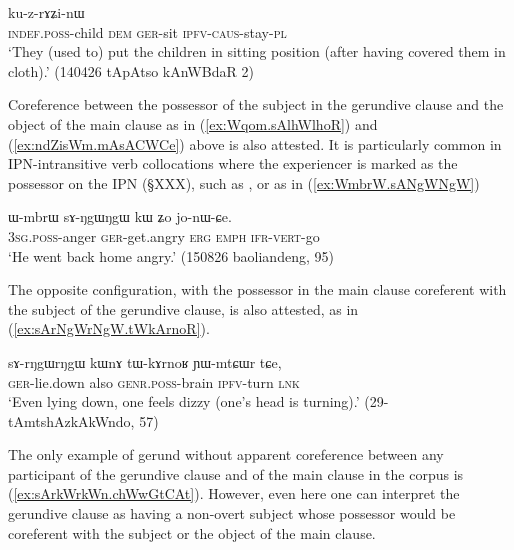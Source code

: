 \begin{exe}
\ex \label{ex:sAmdzWmdzW.kuzrAZinW}
 ku-z-rɤʑi-nɯ \\
\textsc{indef}.\textsc{poss}-child \textsc{dem} \textsc{ger}-sit \textsc{ipfv}-\textsc{caus}-stay-\textsc{pl} \\
\glt `They (used to) put the children in sitting position (after having covered them in cloth).' (140426 tApAtso kAnWBdaR 2)
\end{exe}

Coreference between the possessor of the subject in the gerundive clause and the object of the main clause as in (\ref{ex:Wqom.sAlhWlhoR}) and (\ref{ex:ndZisWm.mAsACWCe}) above is also attested. It is particularly common in IPN-intransitive verb collocations where the experiencer is marked as the possessor on the IPN (§XXX), such as ,  or  as in (\ref{ex:WmbrW.sANgWNgW})

\begin{exe}
\ex \label{ex:WmbrW.sANgWNgW}
\gll ɯ-mbrɯ sɤ-ŋgɯ\redp{}ŋgɯ kɯ ʑo jo-nɯ-ɕe. \\
\textsc{3sg}.\textsc{poss}-anger \textsc{ger}-get.angry \textsc{erg} \textsc{emph} \textsc{ifr}-\textsc{vert}-go \\
\glt `He went back home angry.' (150826 baoliandeng, 95)
\end{exe}

The opposite configuration, with the possessor in the main clause coreferent with the subject of the gerundive clause, is also attested, as in (\ref{ex:sArNgWrNgW.tWkArnoR}).

\begin{exe}
\ex \label{ex:sArNgWrNgW.tWkArnoR}
\gll  sɤ-rŋgɯ\redp{}rŋgɯ kɯnɤ tɯ-kɤrnoʁ ɲɯ-mtɕɯr tɕe, \\
\textsc{ger}-lie.down also \textsc{genr}.\textsc{poss}-brain \textsc{ipfv}-turn \textsc{lnk} \\
\glt `Even lying down, one feels dizzy (one's head is turning).' (29-tAmtshAzkAkWndo, 57)
\end{exe}

The only example of gerund without apparent coreference between any participant of the gerundive clause and of the main clause in the corpus is (\ref{ex:sArkWrkWn.chWwGtCAt}). However, even here one can interpret the gerundive clause as having a non-overt subject whose possessor would be coreferent with the subject or the object of the main clause.%

